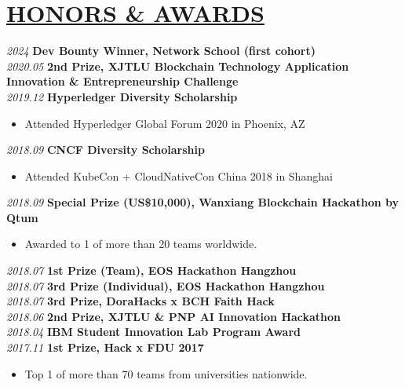\documentclass[11pt]{article}
\begin{document}
%
\section*{\centering\underline{HONORS \& AWARDS}}
\noindent\textit{2024} \textbf{Dev Bounty Winner, Network School (first cohort)}\\[\baselineskip]
\noindent\textit{2020.05} \textbf{2nd Prize, XJTLU Blockchain Technology Application Innovation \& Entrepreneurship Challenge}\\[\baselineskip]
\noindent\textit{2019.12} \textbf{Hyperledger Diversity Scholarship}
\begin{itemize}[noitemsep, topsep=0pt, partopsep=0pt, leftmargin=5em, parsep=0pt]
    \item Attended Hyperledger Global Forum 2020 in Phoenix, AZ
\end{itemize}
\vspace{\baselineskip}
\noindent\textit{2018.09} \textbf{CNCF Diversity Scholarship}
\begin{itemize}[noitemsep, topsep=0pt, partopsep=0pt, leftmargin=5em, parsep=0pt]
    \item Attended KubeCon + CloudNativeCon China 2018 in Shanghai
\end{itemize}
\vspace{\baselineskip}
\noindent\textit{2018.09} \textbf{Special Prize (US\$10,000), Wanxiang Blockchain Hackathon by Qtum}
    \begin{itemize}[noitemsep, topsep=0pt, partopsep=0pt, leftmargin=5em, parsep=0pt]
        \item Awarded to 1 of more than 20 teams worldwide.
    \end{itemize}
\vspace{\baselineskip}
\noindent\textit{2018.07} \textbf{1st Prize (Team), EOS Hackathon Hangzhou}\\[\baselineskip]
\noindent\textit{2018.07} \textbf{3rd Prize (Individual), EOS Hackathon Hangzhou}\\[\baselineskip]
\noindent\textit{2018.07} \textbf{3rd Prize, DoraHacks x BCH Faith Hack}\\[\baselineskip]
\noindent\textit{2018.06} \textbf{2nd Prize, XJTLU \& PNP AI Innovation Hackathon}\\[\baselineskip]
\noindent\textit{2018.04} \textbf{IBM Student Innovation Lab Program Award}\\[\baselineskip]
\noindent\textit{2017.11} \textbf{1st Prize, Hack x FDU 2017}
    \begin{itemize}[noitemsep, topsep=0pt, partopsep=0pt, leftmargin=5em, parsep=0pt]
        \item Top 1 of more than 70 teams from universities nationwide.
    \end{itemize}
\vspace{20mm} %
\end{document}
